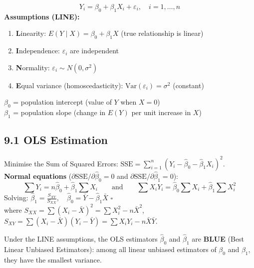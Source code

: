 \documentclass[12pt]{article}
\begin{document}
\bigskip

\begin{defbox}
\[Y_i=\beta_0+\beta_1 X_i+\varepsilon_i,\quad i=1,\ldots,n\]
\textbf{Assumptions (LINE):}
\begin{enumerate}[noitemsep,label=\textbf{\arabic*.}]
  \item \textbf{L}inearity: $E(Y\mid X)=\beta_0+\beta_1 X$ (true relationship is linear)
  \item \textbf{I}ndependence: $\varepsilon_i$ are independent
  \item \textbf{N}ormality: $\varepsilon_i\sim N(0,\sigma^2)$
  \item \textbf{E}qual variance (homoscedasticity): $\text{Var}(\varepsilon_i)=\sigma^2$ (constant)
\end{enumerate}
$\beta_0$ = population intercept (value of $Y$ when $X=0$)\\
$\beta_1$ = population slope (change in $E(Y)$ per unit increase in $X$)
\end{defbox}

\subsection{9.1 OLS Estimation}

\begin{derivbox}
Minimise the Sum of Squared Errors: $\text{SSE}=\sum_{i=1}^n(Y_i-\hat\beta_0-\hat\beta_1 X_i)^2$.\\[4pt]
\textbf{Normal equations} ($\partial\text{SSE}/\partial\hat\beta_0=0$ and $\partial\text{SSE}/\partial\hat\beta_1=0$):
\[\sum Y_i=n\hat\beta_0+\hat\beta_1\sum X_i \qquad\text{and}\qquad \sum X_iY_i=\hat\beta_0\sum X_i+\hat\beta_1\sum X_i^2\]
Solving: \quad $\boxed{\hat\beta_1=\frac{S_{XY}}{S_{XX}}}, \quad \boxed{\hat\beta_0=\bar Y-\hat\beta_1\bar X}$ \hfill$\square$\\[6pt]
where $S_{XX}=\sum(X_i-\bar X)^2=\sum X_i^2-n\bar X^2$,\quad $S_{XY}=\sum(X_i-\bar X)(Y_i-\bar Y)=\sum X_iY_i-n\bar X\bar Y$.
\end{derivbox}

\begin{thmbox}
Under the LINE assumptions, the OLS estimators $\hat\beta_0$ and $\hat\beta_1$ are \textbf{BLUE} (Best Linear Unbiased Estimators): among all linear unbiased estimators of $\beta_0$ and $\beta_1$, they have the smallest variance.
\end{thmbox}
\end{document}
